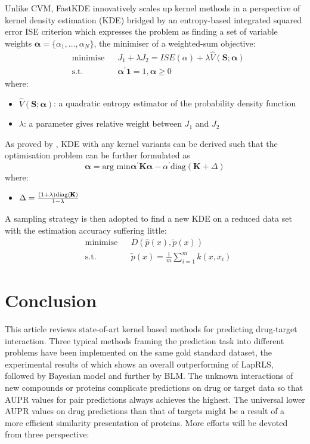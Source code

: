 \documentclass[a4paper,12pt]{report}
\begin{document}
Unlike CVM, FastKDE innovatively scales up kernel methods in a perspective of kernel density estimation (KDE) bridged by an entropy-based integrated squared error {ISE} criterion which expresses the problem as finding a set of variable weights $\pmb{\alpha} = \{\alpha_1, \dots, \alpha_N\}$, the minimiser of a weighted-sum objective:
\begin{equation}
\begin{aligned}
&\text{minimise}
&&J_1 + \lambda J_2 = ISE(\alpha) + \lambda \hat{V}(\pmb{S;\alpha}) \\
&\text{s.t.}
&&\pmb{\alpha^{'}1} = 1, \pmb{\alpha} \geq 0
\end{aligned}
\end{equation}
where:
\begin{itemize}
\item[] $\hat{V}(\pmb{S;\alpha})$: a quadratic entropy estimator of the probability density function
\item[] $\lambda$: a parameter gives relative weight between $J_1$ and $J_2$
\end{itemize}
As proved by \citet{shi14}, KDE with any kernel variants can be derived such that the optimisation problem can be further formulated as
\begin{equation}
\pmb{\alpha}  = \text{arg min}\pmb{\alpha^{'}K\alpha}-\alpha^{'}\text{diag}(\pmb{K}+\Delta)
\end{equation}
where:
\begin{itemize}
\item[] $\Delta = \frac{(1+\lambda)\text{diag(\pmb{K})}}{1-\lambda}$
\end{itemize}
A sampling strategy is then adopted to find a new KDE on a reduced data set with the estimation accuracy suffering little:
\begin{equation}
\begin{aligned}
&\text{minimise} &&D(\hat{p}(x), \tilde{p}(x))\\
&\text{s.t.} &&\tilde{p}(x) = \frac{1}{m}\sum^m_{i=1}k(x, x_i)
\end{aligned}
\end{equation}

\chapter{Conclusion}
This article reviews state-of-art kernel based methods for predicting drug-target interaction. Three typical methods framing the prediction task into different problems have been implemented on the same gold standard dataset, the experimental results of which shows an overall outperforming of LapRLS, followed by Bayesian model and further by BLM. The unknown interactions of new compounds or proteins complicate predictions on drug or target data so that AUPR values for pair predictions always achieves the highest. The universal lower AUPR values on drug predictions than that of targets might be a result of a more efficient similarity presentation of proteins. More efforts will be devoted from three perspective:


\newpage


\clearpage
{}
{}



\end{document}
